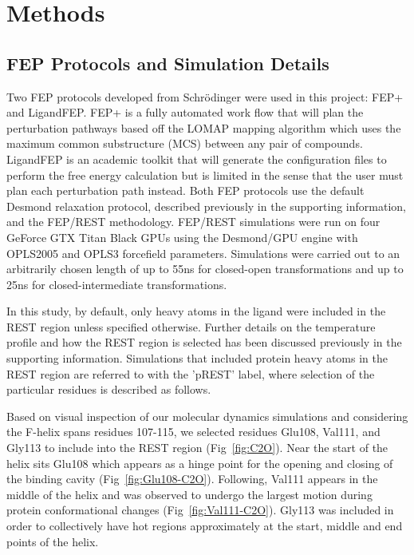 \documentclass[journal=jctcce,manuscript=article]{achemso}
\begin{document}
\section{Methods}
\subsection*{FEP Protocols and Simulation Details}
Two FEP protocols developed from Schr\"{o}dinger were used in this project: FEP+\cite{FEPplus} and LigandFEP\cite{LigandFEP}.
FEP+ is a fully automated work flow that will plan the perturbation pathways based off the LOMAP \cite{LOMAP} mapping algorithm which uses the maximum common substructure (MCS) between any pair of compounds.
LigandFEP is an academic toolkit that will generate the configuration files to perform the free energy calculation but is limited in the sense that the user must plan each perturbation path instead.
Both FEP protocols use the default Desmond relaxation protocol, described previously \cite{FEPplus} in the supporting information, and the FEP/REST methodology\cite{REST,REST2,FEP/REST,FEP/RESTapp}.
FEP/REST simulations were run on four GeForce GTX Titan Black GPUs using the Desmond/GPU engine\cite{DESMONDSoftware,DESMONDPaper1,DESMONDPaper2} with OPLS2005\cite{OPLS2005} and OPLS3\cite{OPLS3} forcefield parameters.
Simulations were carried out to an arbitrarily chosen length of up to 55ns for closed-open transformations and up to 25ns for closed-intermediate transformations.

In this study, by default, only heavy atoms in the ligand were included in the REST region unless specified otherwise.
Further details on the temperature profile and how the REST region is selected has been discussed previously\cite{FEP/REST,FEPplus} in the supporting information.
Simulations that included protein heavy atoms in the REST region are referred to with the 'pREST' label, where selection of the particular residues is described as follows.

Based on visual inspection of our molecular dynamics simulations and considering the F-helix spans residues 107-115, we selected residues Glu108, Val111, and Gly113 to include into the REST region (Fig~\ref{fig:C2O}).
Near the start of the helix sits Glu108 which appears as a hinge point for the opening and closing of the binding cavity (Fig~\ref{fig:Glu108-C2O}).
Following, Val111 appears in the middle of the helix and was observed to undergo the largest motion during protein conformational changes (Fig~\ref{fig:Val111-C2O}).
Gly113 was included in order to collectively have hot regions approximately at the start, middle and end points of the helix.
\end{document}
